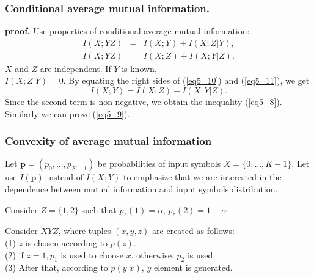 \documentclass[14pt]{beamer}
\renewcommand{\vec}[1]{\ensuremath{\boldsymbol{#1}}}
\begin{document}
\begin{frame}
\frametitle{Conditional average mutual information.}

    \textbf{proof.} Use properties of conditional average mutual information:
    \begin{eqnarray}
    \label{eq5_10} I(X;YZ) &=& I(X;Y) + I(X;Z\vert Y), \\
    \label{eq5_11} I(X;YZ) &=& I(X;Z) + I(X;Y\vert Z).
    \end{eqnarray}
    $X$ and $Z$ are independent. If $Y$ is known, \\
    $I(X;Z\vert Y) = 0$. 
    By equating the right sides of (\ref{eq5_10}) and
    (\ref{eq5_11}), we get
    \[
    I(X;Y) = I(X;Z) + I(X;Y\vert Z).
    \]
    Since the second term is non-negative, we obtain the inequality
    (\ref{eq5_8}). Similarly we can prove (\ref{eq5_9}). 

\end{frame}




\begin{frame}
\frametitle{Convexity of average mutual information}
\begin{itemize}
 \small{

    \item Let ${\vec p} = (p_0 ,...,p_{K - 1} )$ be probabilities of input symbols $X = \{0,...,K - 1\}$. Let use $I({\vec p})$ instead of $I(X;Y)$ to emphasize that we are interested in the dependence between mutual information and input symbols distribution.
    
    \item Consider $Z = \{1,2\}$ such that $p_z(1) = \alpha$, $p_z(2)=1-\alpha$
    
    \item Consider $XYZ$, where tuples $(x,y,z)$ are created as follows: \\
    (1) $z$ is chosen according to $p(z)$. \\
    (2) if $z = 1, p_1$ is used to choose $x$, otherwise, $p_2$ is used.\\
    (3) After that, according to $p(y|x)$, $y$ element is generated.\\
}
\end{itemize}
\end{frame}
\end{document}
